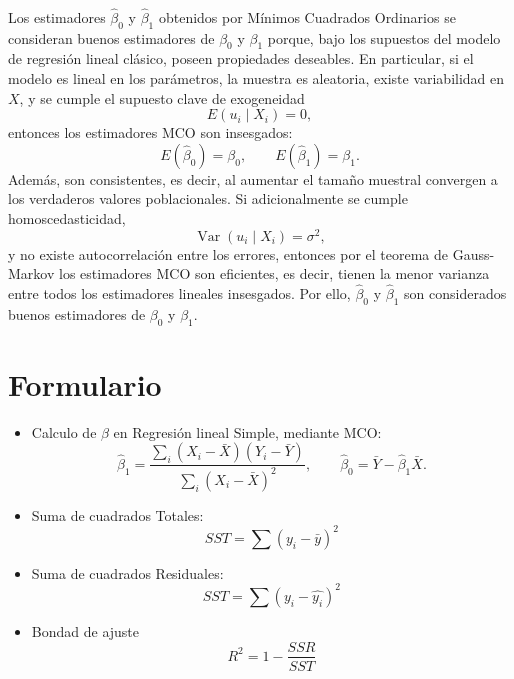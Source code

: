 \documentclass[10pt,a4paper]{article}
\begin{document}
\begin{enumerate}
\begin{enumerate}
\\
Los estimadores \(\hat{\beta}_0\) y \(\hat{\beta}_1\) obtenidos por Mínimos Cuadrados Ordinarios se consideran buenos estimadores de \(\beta_0\) y \(\beta_1\) porque, bajo los supuestos del modelo de regresión lineal clásico, poseen propiedades deseables. En particular, si el modelo es lineal en los parámetros, la muestra es aleatoria, existe variabilidad en \(X\), y se cumple el supuesto clave de exogeneidad
\[
E(u_i\mid X_i)=0,
\]
entonces los estimadores MCO son insesgados:
\[
E(\hat{\beta}_0)=\beta_0, \qquad E(\hat{\beta}_1)=\beta_1.
\]
Además, son consistentes, es decir, al aumentar el tamaño muestral convergen a los verdaderos valores poblacionales. Si adicionalmente se cumple homoscedasticidad,
\[
\operatorname{Var}(u_i\mid X_i)=\sigma^2,
\]
y no existe autocorrelación entre los errores, entonces por el teorema de Gauss-Markov los estimadores MCO son eficientes, es decir, tienen la menor varianza entre todos los estimadores lineales insesgados. Por ello, \(\hat{\beta}_0\) y \(\hat{\beta}_1\) son considerados buenos estimadores de \(\beta_0\) y \(\beta_1\).

\end{enumerate}




\end{enumerate}


\newpage
\section{Formulario}
\begin{itemize}

\item Calculo de $\beta$ en Regresión lineal Simple, mediante MCO:
\[
\hat{\beta}_1=\frac{\sum_i (X_i-\bar{X})(Y_i-\bar{Y})}{\sum_i (X_i-\bar{X})^2},\qquad
\hat{\beta}_0=\bar{Y}-\hat{\beta}_1\bar{X}.
\]

\item Suma de cuadrados Totales:
$$SST=\sum (y_i-\bar{y})^2$$

\item Suma de cuadrados Residuales:
$$SST=\sum (y_i-\hat{y_i})^2$$

\item Bondad de ajuste
$$R^2 = 1-\frac{SSR}{SST}$$

\end{itemize}
 
\end{document}
